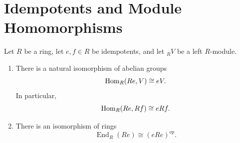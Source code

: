 \section{Idempotents and Module Homomorphisms}

\begin{theorem}
    Let $R$ be a ring, let $e,f\in R$ be idempotents, and let ${}_RV$ be a left $R$-module.
    \begin{enumerate}
        \item There is a natural isomorphism of abelian groups
              \[
                  \mathrm{Hom}_R(Re,V)\cong eV.
              \]
              In particular,
              \[
                  \mathrm{Hom}_R(Re,Rf)\cong eRf.
              \]

        \item There is an isomorphism of rings
              \[
                  \operatorname{End}_R(Re)\cong (eRe)^{op}.
              \]
    \end{enumerate}
\end{theorem}

